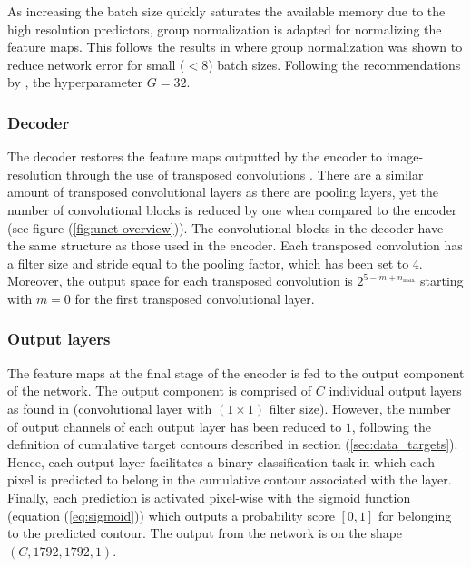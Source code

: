 \documentclass[../main/thesis]{subfiles}
\begin{document}
As increasing the batch size quickly saturates the available memory due to the high resolution predictors, group normalization is adapted for normalizing the feature maps. This follows the results in \citet{Wu2018} where group normalization was shown to reduce network error for small ($<8$) batch sizes. Following the recommendations by \citet{Wu2018}, the hyperparameter $G=32$. 

\subsubsection{Decoder}
The decoder restores the feature maps outputted by the encoder to image-resolution through the use of transposed convolutions \citep{Zeiler2010}. There are a similar amount of transposed convolutional layers as there are pooling layers, yet the number of convolutional blocks is reduced by one when compared to the encoder (see figure (\ref{fig:unet-overview})). The convolutional blocks in the decoder have the same structure as those used in the encoder. Each transposed convolution has a filter size and stride equal to the pooling factor, which has been set to 4. Moreover, the output space for each transposed convolution is $2^{5 - m + n_{\text{max}}}$ starting with $m = 0$ for the first transposed convolutional layer.

\subsubsection{Output layers}
\label{sec:architecture-output}
The feature maps at the final stage of the encoder is fed to the output component of the network. The output component is comprised of $C$ individual output layers as found in \citet{Ronneberger2015} (convolutional layer with $(1 \times 1)$ filter size). However, the number of output channels of each output layer has been reduced to $1$, following the definition of cumulative target contours described in section (\ref{sec:data_targets}). Hence, each output layer facilitates a binary classification task in which each pixel is predicted to belong in the cumulative contour associated with the layer. Finally, each prediction is activated pixel-wise with the sigmoid function (equation (\ref{eq:sigmoid})) which outputs a probability score $\left[0, 1\right]$ for belonging to the predicted contour. The output from the network is on the shape $(C, 1792, 1792, 1)$.
\end{document}
